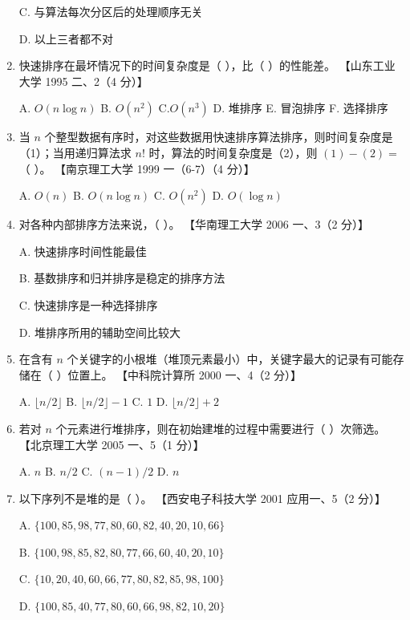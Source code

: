 \documentclass[lang=cn,newtx,10pt,scheme=chinese]{../../elegantbook}
\begin{document}
\begin{enumerate}
    C. 与算法每次分区后的处理顺序无关  

    D. 以上三者都不对  

    \item 快速排序在最坏情况下的时间复杂度是（ ），比（ ）的性能差。  
    【山东工业大学 1995 二、2（4 分）】  

    A. $O(n \log n)$ \quad B. $O(n^2)$ \quad C.$O(n^3)$ D. 堆排序 \quad E. 冒泡排序   \quad F. 选择排序

    \item 当 $n$ 个整型数据有序时，对这些数据用快速排序算法排序，则时间复杂度是（1）；当用递归算法求 $n!$ 时，算法的时间复杂度是（2），则 $(1) - (2) = $（ ）。  
    【南京理工大学 1999 一（6-7）（4 分）】

    A. $O(n)$ \quad B. $O(n \log n)$ \quad C. $O(n^2)$ \quad D. $O(\log n)$  

    \item 对各种内部排序方法来说，（ ）。  
    【华南理工大学 2006 一、3（2 分）】  

    A. 快速排序时间性能最佳  

    B. 基数排序和归并排序是稳定的排序方法  

    C. 快速排序是一种选择排序  

    D. 堆排序所用的辅助空间比较大  

    \item 在含有 $n$ 个关键字的小根堆（堆顶元素最小）中，关键字最大的记录有可能存储在（ ）位置上。  
    【中科院计算所 2000 一、4（2 分）】  

    A. $\lfloor n/2 \rfloor$ \quad B. $\lfloor n/2 \rfloor - 1$ \quad C. $1$ \quad D. $\lfloor n/2 \rfloor + 2$  

    \item 若对 $n$ 个元素进行堆排序，则在初始建堆的过程中需要进行（ ）次筛选。  
    【北京理工大学 2005 一、5（1 分）】  

    A. $n$ \quad B. $n/2$ \quad C. $(n-1)/2$ \quad D. $n$  

    \item 以下序列不是堆的是（ ）。  
    【西安电子科技大学 2001 应用一、5（2 分）】  

    A. $\{100, 85, 98, 77, 80, 60, 82, 40, 20, 10, 66\}$  

    B. $\{100, 98, 85, 82, 80, 77, 66, 60, 40, 20, 10\}$  

    C. $\{10, 20, 40, 60, 66, 77, 80, 82, 85, 98, 100\}$  

    D. $\{100, 85, 40, 77, 80, 60, 66, 98, 82, 10, 20\}$  


\end{enumerate}
\end{document}
